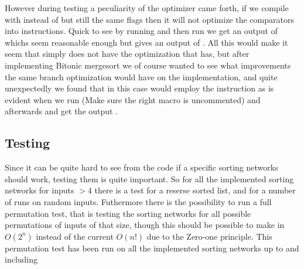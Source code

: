 However during testing a peculiarity of the  optimizer came forth, if
we compile  with  instead of  but still the same
flags then it will not optimize the comparators into  instructions.
Quick to see by running  and then run
 we get an output of
 whichs seem reasonable enough but
 gives an output of
. All this would make it seem that  simply does not have the
optimization that  has, but after implementing Bitonic mergesort we of
course wanted to see what improvements the same branch optimization would have
on the implementation, and quite unexpectedly we found that in this case
 would employ the  instruction as is evident when we run
(Make sure the right macro is uncommented)  and afterwards
 and get the output
.




\subsection{Testing}
Since it can be quite hard to see from the code if a specific sorting networks
should work, testing them is quite important. So for all the implemented
sorting networks for inputs $>4$ there is a test for a reserse sorted list, and
for a number of runs on random inputs. Futhermore there is the possibility to
run a full permutation test, that is testing the sorting networks for all
possible permutations of inputs of that size, though this should be possible to
make in $O(2^n)$ instead of the current $O(n!)$ due to the Zero-one principle.
This permutation test has been run on all the implemented sorting networks up
to and including 
